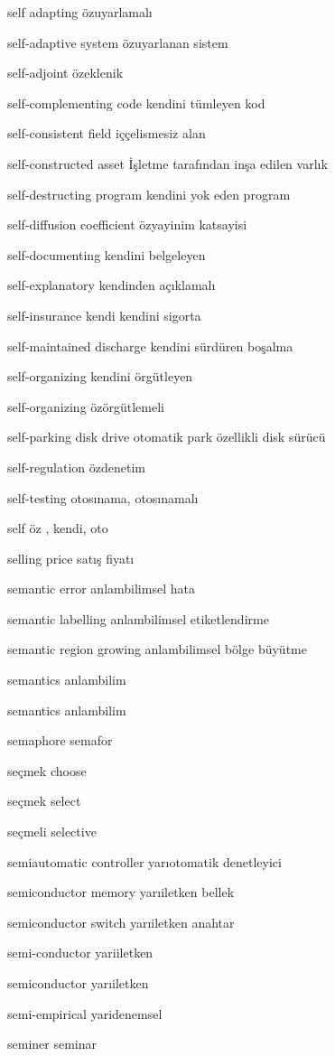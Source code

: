 \documentclass[12pt,fleqn]{article}\usepackage{../../common}
\begin{document}
self adapting özuyarlamalı

self-adaptive system özuyarlanan sistem

self-adjoint özeklenik

self-complementing code kendini tümleyen kod

self-consistent field iççelismesiz alan

self-constructed asset İşletme tarafından inşa edilen varlık

self-destructing program kendini yok eden program

self-diffusion coefficient özyayinim katsayisi

self-documenting kendini belgeleyen

self-explanatory kendinden açıklamalı

self-insurance kendi kendini sigorta

self-maintained discharge kendini sürdüren boşalma

self-organizing kendini örgütleyen

self-organizing özörgütlemeli

self-parking disk drive otomatik park özellikli disk sürücü

self-regulation özdenetim

self-testing otosınama, otosınamalı

self öz , kendi, oto

selling price satış fiyatı

semantic error anlambilimsel hata

semantic labelling anlambilimsel etiketlendirme

semantic region growing anlambilimsel bölge büyütme

semantics anlambilim

semantics anlambilim

semaphore semafor

seçmek choose

seçmek select

seçmeli selective

semiautomatic controller yarıotomatik denetleyici

semiconductor memory yarıiletken bellek

semiconductor switch yarıiletken anahtar

semi-conductor yariiletken

semiconductor yarıiletken

semi-empirical yaridenemsel

seminer seminar
\end{document}
